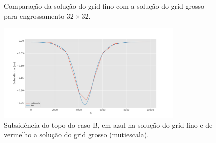 \begin{figure}[h]
\center
{}
\qquad
{}
\caption{Comparação da solução do grid fino com a solução do grid grosso para engrossamento $32\times32$.  }
\label{fig:comparacaoFinoGrosso}
\end{figure}

\begin{figure}[!htbp]
\centering
\includegraphics[width=0.8\textwidth]{chap08/figs/Reservoir320x320_10x10_subsidence_multiscale.png}
\caption{Subsidência do topo do caso B, em azul na solução do grid fino e de vermelho a solução do grid grosso (mutiescala). }
\label{fig:subsidence} 
\end{figure}


